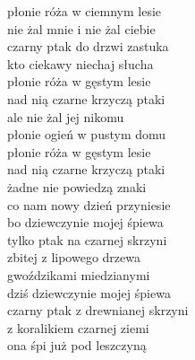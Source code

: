 \begin{text}
    płonie róża w ciemnym lesie\\
    nie żal mnie i nie żal ciebie\\
    czarny ptak do drzwi zastuka\\
    kto ciekawy niechaj słucha\\
    płonie róża w gęstym lesie\\
    nad nią czarne krzyczą ptaki\\
    ale nie żal jej nikomu\\
    płonie ogień w pustym domu\\
    płonie róża w gęstym lesie\\
    nad nią czarne krzyczą ptaki\\
    żadne nie powiedzą znaki\\
    co nam nowy dzień przyniesie\\
    bo dziewczynie mojej śpiewa\\
    tylko ptak na czarnej skrzyni\\
    zbitej z lipowego drzewa\\
    gwoździkami miedzianymi\\
    dziś dziewczynie mojej śpiewa\\
    czarny ptak z drewnianej skrzyni\\
    z koralikiem czarnej ziemi\\
    ona śpi już pod leszczyną
\end{text}
\begin{chord}

\end{chord}